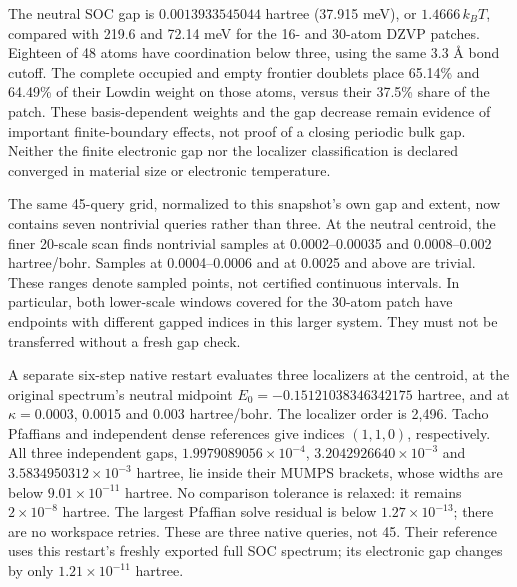 \documentclass[11pt]{article}
\begin{document}
The neutral SOC gap is $0.0013933545044$ hartree (37.915 meV),
or $1.4666\,k_BT$, compared with 219.6 and 72.14 meV for the
16- and 30-atom DZVP patches. Eighteen of 48 atoms have coordination
below three, using the same 3.3 \AA{} bond cutoff. The complete
occupied and empty frontier doublets place 65.14\% and 64.49\%
of their Lowdin weight on those atoms, versus their 37.5\%
share of the patch. These basis-dependent weights and the gap
decrease remain evidence of important finite-boundary effects,
not proof of a closing periodic bulk gap. Neither the finite
electronic gap nor the localizer classification is
declared converged in material size or electronic temperature.

The same 45-query grid, normalized to this snapshot's own gap
and extent, now contains seven nontrivial queries rather than
three. At the neutral centroid, the finer 20-scale scan finds
nontrivial samples at 0.0002--0.00035 and 0.0008--0.002
hartree/bohr. Samples at 0.0004--0.0006 and at 0.0025 and
above are trivial. These ranges denote sampled points, not
certified continuous intervals. In particular, both lower-scale
windows covered for the 30-atom patch have endpoints with
different gapped indices in this larger system. They must not
be transferred without a fresh gap check.

A separate six-step native restart evaluates three localizers
at the centroid, at the original spectrum's neutral midpoint
$E_0=-0.15121038346342175$ hartree, and at
$\kappa=0.0003$, 0.0015 and 0.003 hartree/bohr. The localizer
order is 2,496. Tacho Pfaffians and independent dense references
give indices $(1,1,0)$, respectively. All three independent gaps,
$1.9979089056\times10^{-4}$, $3.2042926640\times10^{-3}$ and
$3.5834950312\times10^{-3}$ hartree, lie inside their MUMPS
brackets, whose widths are below $9.01\times10^{-11}$ hartree.
No comparison tolerance is relaxed: it remains
$2\times10^{-8}$ hartree. The largest Pfaffian solve residual
is below $1.27\times10^{-13}$; there are no workspace retries.
These are three native queries, not 45. Their reference uses
this restart's freshly exported full SOC spectrum; its electronic
gap changes by only $1.21\times10^{-11}$ hartree.
\end{document}
